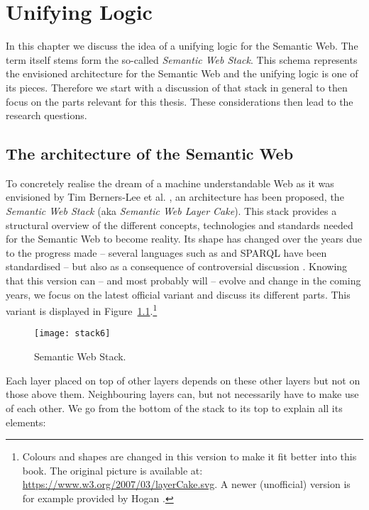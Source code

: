 \chapter{Unifying Logic} \label{unilog}

In this chapter we discuss the idea of a unifying logic for the Semantic Web. The term itself stems form the so-called \emph{Semantic Web Stack}.
This schema represents the envisioned architecture for the Semantic Web and the unifying logic is one of its pieces.
Therefore we start with a discussion of that stack in general to then focus on the parts relevant for this thesis. These considerations then lead to the research questions.


\section{The architecture of the Semantic Web}
 To concretely realise the dream of a machine understandable Web as it was envisioned by Tim Berners-Lee et al. \cite{SemanticWeb}, 
an architecture has been proposed, the  
 \emph{Semantic Web Stack} (aka \emph{Semantic Web Layer Cake}).
This stack provides a structural overview of the different concepts, technologies and standards needed for the Semantic Web to become reality. 
Its shape has changed over the years \cite{Gerber2} due to the progress made -- several languages such as \rdf \cite{rdf} and SPARQL \cite{sparql} have been standardised
-- but also 
as a consequence of controversial discussion \cite{twotowers,kifer2005}. 
Knowing that this version can -- and most probably will -- evolve and change in the coming years, 
we focus %
on the latest official 
variant %
 and discuss its different parts. This variant is displayed in Figure~\ref{fig:stack}.\footnote{Colours and shapes are changed in this version to make it fit better into this book. 
The original picture is available at: 
\url{https://www.w3.org/2007/03/layerCake.svg}.
A newer (unofficial) version is for example provided by Hogan \cite{hogan}.} 
\begin{figure}[!ht]
	\centering
	\texttt{[image: stack6]}
	\caption[Semantic Web Stack]{Semantic Web Stack.}
	\label{fig:stack}
\end{figure}
Each layer placed on top of other layers  depends on  these other layers but not on those above them. Neighbouring layers can, but not necessarily have to make use of each other. 
We go from the bottom of the stack to its top to explain all its elements:

